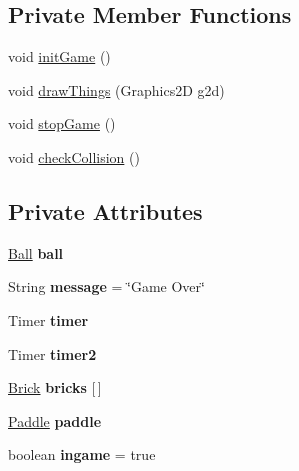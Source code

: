 \subsection*{Private Member Functions}
\begin{DoxyCompactItemize}
\item 
void \hyperlink{class_main_1_1_panel_a765d0ade3fdbb19e9521086296e50655}{init\+Game} ()
\item 
void \hyperlink{class_main_1_1_panel_ab9cc3da060f155580e32bbd8cec3b159}{draw\+Things} (Graphics2D g2d)
\item 
void \hyperlink{class_main_1_1_panel_a533066171c505729288775a25d0e2b8b}{stop\+Game} ()
\item 
void \hyperlink{class_main_1_1_panel_aab0094c5b9b7af46239e23dd646e2dc9}{check\+Collision} ()
\end{DoxyCompactItemize}
\subsection*{Private Attributes}
\begin{DoxyCompactItemize}
\item 
\hyperlink{class_main_1_1_ball}{Ball} {\bfseries ball}\hypertarget{class_main_1_1_panel_a99783cc33bc9f6afba73d36605d7b391}{}\label{class_main_1_1_panel_a99783cc33bc9f6afba73d36605d7b391}

\item 
String {\bfseries message} = \char`\"{}Game Over\char`\"{}\hypertarget{class_main_1_1_panel_a426ef03a02527f18a2bb122c623f9dd1}{}\label{class_main_1_1_panel_a426ef03a02527f18a2bb122c623f9dd1}

\item 
Timer {\bfseries timer}\hypertarget{class_main_1_1_panel_a8a2b9dd3079d409d03ca212ef3eb98df}{}\label{class_main_1_1_panel_a8a2b9dd3079d409d03ca212ef3eb98df}

\item 
Timer {\bfseries timer2}\hypertarget{class_main_1_1_panel_a749ae740aab86aaf62e5a76009b60978}{}\label{class_main_1_1_panel_a749ae740aab86aaf62e5a76009b60978}

\item 
\hyperlink{class_main_1_1_brick}{Brick} {\bfseries bricks} \mbox{[}$\,$\mbox{]}\hypertarget{class_main_1_1_panel_acafb3c641a56dc6e3c60bbf61c4b160d}{}\label{class_main_1_1_panel_acafb3c641a56dc6e3c60bbf61c4b160d}

\item 
\hyperlink{class_main_1_1_paddle}{Paddle} {\bfseries paddle}\hypertarget{class_main_1_1_panel_a7732f40ed71e4760c0d3e42cb29ebd31}{}\label{class_main_1_1_panel_a7732f40ed71e4760c0d3e42cb29ebd31}

\item 
boolean {\bfseries ingame} = true\hypertarget{class_main_1_1_panel_a22f6b9585a0179a20a84f5d16a335489}{}\label{class_main_1_1_panel_a22f6b9585a0179a20a84f5d16a335489}

\end{DoxyCompactItemize}
